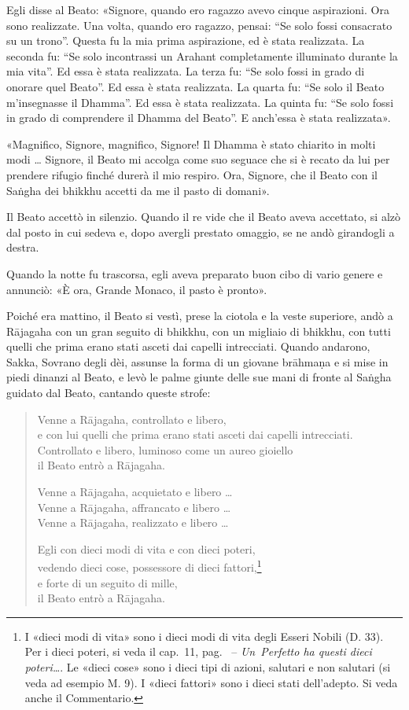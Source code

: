 Egli disse al Beato: «Signore, quando ero ragazzo avevo cinque aspirazioni. Ora
sono realizzate. Una volta, quando ero ragazzo, pensai: “Se solo fossi
consacrato su un trono”. Questa fu la mia prima aspirazione, ed è stata
realizzata. La seconda fu: “Se solo incontrassi un Arahant completamente
illuminato durante la mia vita”. Ed essa è stata realizzata. La terza fu: “Se
solo fossi in grado di onorare quel Beato”. Ed essa è stata realizzata. La
quarta fu: “Se solo il Beato m’insegnasse il Dhamma”. Ed essa è stata
realizzata. La quinta fu: “Se solo fossi in grado di comprendere il Dhamma del
Beato”. E anch’essa è stata realizzata».

«Magnifico, Signore, magnifico, Signore! Il Dhamma è stato chiarito in molti
modi … Signore, il Beato mi accolga come suo seguace che si è recato da lui per
prendere rifugio finché durerà il mio respiro. Ora, Signore, che il Beato con il
Saṅgha dei bhikkhu accetti da me il pasto di domani».

Il Beato accettò in silenzio. Quando il re vide che il Beato aveva accettato, si
alzò dal posto in cui sedeva e, dopo avergli prestato omaggio, se ne andò
girandogli a destra.

Quando la notte fu trascorsa, egli aveva preparato buon cibo di vario genere e
annunciò: «È ora, Grande Monaco, il pasto è pronto».

Poiché era mattino, il Beato si vestì, prese la ciotola e la veste superiore,
andò a Rājagaha con un gran seguito di bhikkhu, con un migliaio di bhikkhu, con
tutti quelli che prima erano stati asceti dai capelli intrecciati. Quando
andarono, Sakka, Sovrano degli dèi, assunse la forma di un giovane brāhmaṇa e si
mise in piedi dinanzi al Beato, e levò le palme giunte delle sue mani di fronte
al Saṅgha guidato dal Beato, cantando queste strofe:

\begin{quote}
Venne a Rājagaha, controllato e libero, \\
e con lui quelli che prima erano stati asceti dai capelli intrecciati. \\
Controllato e libero, luminoso come un aureo gioiello \\
il Beato entrò a Rājagaha.

Venne a Rājagaha, acquietato e libero … \\
Venne a Rājagaha, affrancato e libero … \\
Venne a Rājagaha, realizzato e libero …

Egli con dieci modi di vita e con dieci poteri, \\
vedendo dieci cose, possessore di dieci fattori,\footnote{%
  I «dieci modi di vita» sono i dieci modi di vita degli Esseri Nobili (D. 33).
  Per i dieci poteri, si veda il cap.~11, pag.~\pageref{pag206} --
  \emph{Un~Perfetto ha questi dieci poteri\ldots}. Le «dieci cose» sono i dieci
  tipi di azioni, salutari e non salutari (si veda ad esempio M. 9). I «dieci
  fattori» sono i dieci stati dell’adepto. Si veda anche il Commentario.} \\
e forte di un seguito di mille, \\
il Beato entrò a Rājagaha.
\end{quote}

